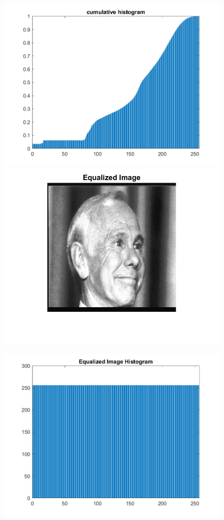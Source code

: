 \documentclass[11pt]{article} %
\begin{document}
\begin{figure}
\centering
\includegraphics{Cumulative_Hist.png}
\includegraphics{Equalized_Image.png}
\end{figure}
\begin{figure}
\centering
\includegraphics{Equalized_Hist.png}
\end{figure}
\end{document}
